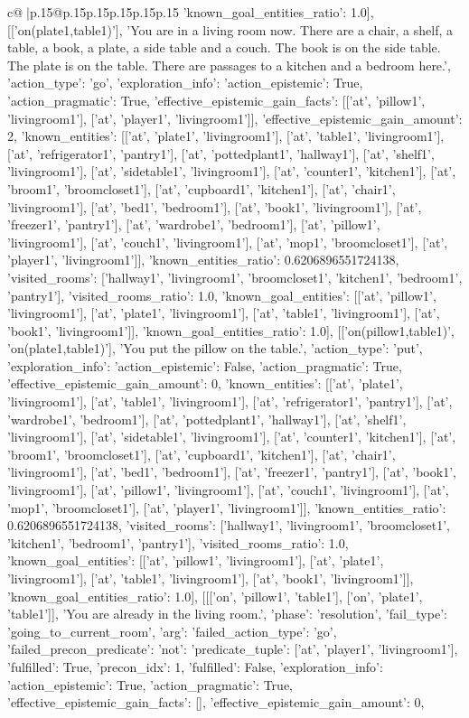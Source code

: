 \documentclass{article}
\begin{document}
{\begin{supertabular}{c@{$\;$}|p{.15\linewidth}@{}p{.15\linewidth}p{.15\linewidth}p{.15\linewidth}p{.15\linewidth}p{.15\linewidth}}
{{{'known_goal_entities_ratio': 1.0}}], [['on(plate1,table1)'], 'You are in a living room now. There are a chair, a shelf, a table, a book, a plate, a side table and a couch. The book is on the side table. The plate is on the table. There are passages to a kitchen and a bedroom here.', {'action_type': 'go', 'exploration_info': {'action_epistemic': True, 'action_pragmatic': True, 'effective_epistemic_gain_facts': [['at', 'pillow1', 'livingroom1'], ['at', 'player1', 'livingroom1']], 'effective_epistemic_gain_amount': 2, 'known_entities': [['at', 'plate1', 'livingroom1'], ['at', 'table1', 'livingroom1'], ['at', 'refrigerator1', 'pantry1'], ['at', 'pottedplant1', 'hallway1'], ['at', 'shelf1', 'livingroom1'], ['at', 'sidetable1', 'livingroom1'], ['at', 'counter1', 'kitchen1'], ['at', 'broom1', 'broomcloset1'], ['at', 'cupboard1', 'kitchen1'], ['at', 'chair1', 'livingroom1'], ['at', 'bed1', 'bedroom1'], ['at', 'book1', 'livingroom1'], ['at', 'freezer1', 'pantry1'], ['at', 'wardrobe1', 'bedroom1'], ['at', 'pillow1', 'livingroom1'], ['at', 'couch1', 'livingroom1'], ['at', 'mop1', 'broomcloset1'], ['at', 'player1', 'livingroom1']], 'known_entities_ratio': 0.6206896551724138, 'visited_rooms': ['hallway1', 'livingroom1', 'broomcloset1', 'kitchen1', 'bedroom1', 'pantry1'], 'visited_rooms_ratio': 1.0, 'known_goal_entities': [['at', 'pillow1', 'livingroom1'], ['at', 'plate1', 'livingroom1'], ['at', 'table1', 'livingroom1'], ['at', 'book1', 'livingroom1']], 'known_goal_entities_ratio': 1.0}}], [['on(pillow1,table1)', 'on(plate1,table1)'], 'You put the pillow on the table.', {'action_type': 'put', 'exploration_info': {'action_epistemic': False, 'action_pragmatic': True, 'effective_epistemic_gain_amount': 0, 'known_entities': [['at', 'plate1', 'livingroom1'], ['at', 'table1', 'livingroom1'], ['at', 'refrigerator1', 'pantry1'], ['at', 'wardrobe1', 'bedroom1'], ['at', 'pottedplant1', 'hallway1'], ['at', 'shelf1', 'livingroom1'], ['at', 'sidetable1', 'livingroom1'], ['at', 'counter1', 'kitchen1'], ['at', 'broom1', 'broomcloset1'], ['at', 'cupboard1', 'kitchen1'], ['at', 'chair1', 'livingroom1'], ['at', 'bed1', 'bedroom1'], ['at', 'freezer1', 'pantry1'], ['at', 'book1', 'livingroom1'], ['at', 'pillow1', 'livingroom1'], ['at', 'couch1', 'livingroom1'], ['at', 'mop1', 'broomcloset1'], ['at', 'player1', 'livingroom1']], 'known_entities_ratio': 0.6206896551724138, 'visited_rooms': ['hallway1', 'livingroom1', 'broomcloset1', 'kitchen1', 'bedroom1', 'pantry1'], 'visited_rooms_ratio': 1.0, 'known_goal_entities': [['at', 'pillow1', 'livingroom1'], ['at', 'plate1', 'livingroom1'], ['at', 'table1', 'livingroom1'], ['at', 'book1', 'livingroom1']], 'known_goal_entities_ratio': 1.0}}], [[['on', 'pillow1', 'table1'], ['on', 'plate1', 'table1']], 'You are already in the living room.', {'phase': 'resolution', 'fail_type': 'going_to_current_room', 'arg': {'failed_action_type': 'go', 'failed_precon_predicate': {'not': {'predicate_tuple': ['at', 'player1', 'livingroom1'], 'fulfilled': True, 'precon_idx': 1}, 'fulfilled': False}}, 'exploration_info': {'action_epistemic': True, 'action_pragmatic': True, 'effective_epistemic_gain_facts': [], 'effective_epistemic_gain_amount': 0, }}}
\end{supertabular}}
\end{document}
